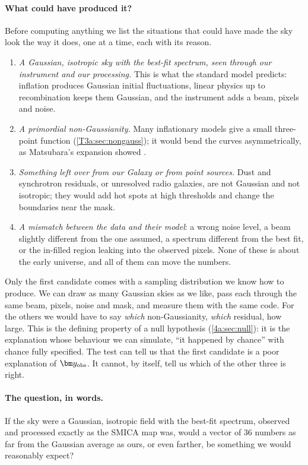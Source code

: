 \paragraph{What could have produced it?} Before computing anything we list the situations that could have
made the sky look the way it does, one at a time, each with its reason.
\begin{enumerate}[itemsep=2pt,leftmargin=1.5em]
  \item \emph{A Gaussian, isotropic sky with the best-fit spectrum, seen through our instrument and our
        processing.} This is what the standard model predicts: inflation produces Gaussian initial
        fluctuations, linear physics up to recombination keeps them Gaussian, and the instrument adds a
        beam, pixels and noise.
  \item \emph{A primordial non-Gaussianity.} Many inflationary models give a small three-point function
        (\cref{T3a:sec:nongauss}); it would bend the curves asymmetrically, as Matsubara's expansion showed
        \cite{Matsubara2003}.
  \item \emph{Something left over from our Galaxy or from point sources.} Dust and synchrotron residuals,
        or unresolved radio galaxies, are not Gaussian and not isotropic; they would add hot spots at high
        thresholds and change the boundaries near the mask.
  \item \emph{A mismatch between the data and their model}: a wrong noise level, a beam slightly
        different from the one assumed, a spectrum different from the best fit, or the in-filled region
        leaking into the observed pixels. None of these is about the early universe, and all of them can move
        the numbers.
\end{enumerate}
Only the first candidate comes with a sampling distribution we know how to produce. We can draw as many
Gaussian skies as we like, pass each through the same beam, pixels, noise and mask, and measure them with the
same code. For the others we would have to say \emph{which} non-Gaussianity, \emph{which} residual, how large.
This is the defining property of a null hypothesis (\cref{4a:sec:null}): it is the explanation whose
behaviour we can simulate, ``it happened by chance'' with chance fully specified. The test can tell us that the
first candidate is a poor explanation of $\bm y_{\rm obs}$. It cannot, by itself, tell us which of the other
three is right.

\paragraph{The question, in words.} If the sky were a Gaussian, isotropic field with the best-fit spectrum,
observed and processed exactly as the SMICA map was, would a vector of $36$ numbers as far from the Gaussian
average as ours, or even farther, be something we would reasonably expect?

